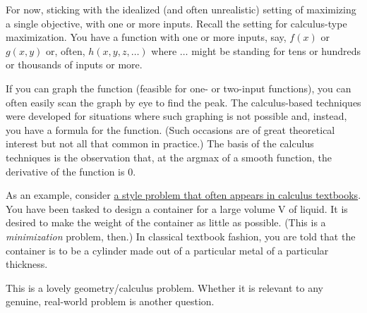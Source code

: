 \documentclass[
  letterpaper,
  DIV=11,
  numbers=noendperiod,
  oneside]{scrreprt}
\begin{document}
For now, sticking with the idealized (and often unrealistic) setting of
maximizing a single objective, with one or more inputs. Recall the
setting for calculus-type maximization. You have a function with one or
more inputs, say, \(f(x)\) or \(g(x,y)\) or, often,
\(h(x, y, z, \ldots)\) where \(\ldots\) might be standing for tens or
hundreds or thousands of inputs or more.

If you can graph the function (feasible for one- or two-input
functions), you can often easily scan the graph by eye to find the peak.
The calculus-based techniques were developed for situations where such
graphing is not possible and, instead, you have a formula for the
function. (Such occasions are of great theoretical interest but not all
that common in practice.) The basis of the calculus techniques is the
observation that, at the argmax of a smooth function, the derivative of
the function is 0.

As an example, consider
\href{https://www.dummies.com/education/math/calculus/calculate-the-optimum-volume-of-a-soup-can-practice-question/}{a
style problem that often appears in calculus textbooks}. You have been
tasked to design a container for a large volume V of liquid. It is
desired to make the weight of the container as little as possible. (This
is a \emph{minimization} problem, then.) In classical textbook fashion,
you are told that the container is to be a cylinder made out of a
particular metal of a particular thickness.

This is a lovely geometry/calculus problem. Whether it is relevant to
any genuine, real-world problem is another question.
\end{document}
